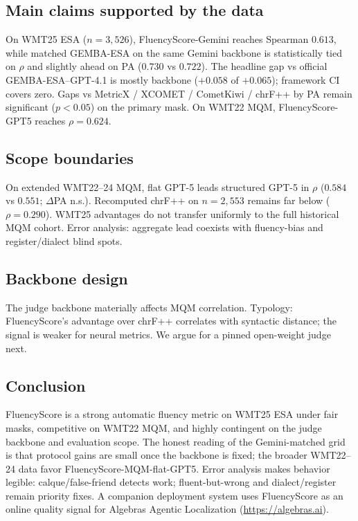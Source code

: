 \documentclass[11pt]{article}
\newcommand{\FS}{FluencyScore}
\begin{document}
\subsection{Main claims supported by the data}
On WMT25 ESA ($n{=}3{,}526$), \FS{}-Gemini reaches Spearman $0.613$, while matched
GEMBA-ESA on the same Gemini backbone is statistically tied on $\rho$ and
slightly ahead on PA ($0.730$ vs $0.722$).
The headline gap vs official GEMBA-ESA--GPT-4.1 is mostly backbone
(${+}0.058$ of ${+}0.065$); framework CI covers zero.
Gaps vs MetricX / XCOMET / CometKiwi / chrF++ by PA remain significant
($p{<}0.05$) on the primary mask.
On WMT22 MQM, \FS{}-GPT5 reaches $\rho{=}0.624$.

\subsection{Scope boundaries}
On extended WMT22--24 MQM, flat GPT-5 leads structured GPT-5 in $\rho$
($0.584$ vs $0.551$; $\Delta$PA n.s.).
Recomputed chrF++ on $n{=}2{,}553$ remains far below ($\rho{=}0.290$).
WMT25 advantages do not transfer uniformly to the full historical MQM cohort.
Error analysis: aggregate lead coexists with fluency-bias and register/dialect
blind spots.

\subsection{Backbone design}
The judge backbone materially affects MQM correlation.
Typology: \FS{}'s advantage over chrF++ correlates with syntactic distance; the
signal is weaker for neural metrics.
We argue for a pinned open-weight judge next.

\subsection{Conclusion}
\FS{} is a strong automatic fluency metric on WMT25 ESA under fair masks,
competitive on WMT22 MQM, and highly contingent on the judge backbone and
evaluation scope.
The honest reading of the Gemini-matched grid is that protocol gains are small
once the backbone is fixed; the broader WMT22--24 data favor
FluencyScore-MQM-flat-GPT5.
Error analysis makes behavior legible: calque/false-friend detects work;
fluent-but-wrong and dialect/register remain priority fixes.
A companion deployment system uses \FS{} as an online quality signal for Algebras
Agentic Localization (\url{https://algebras.ai}).
\end{document}

